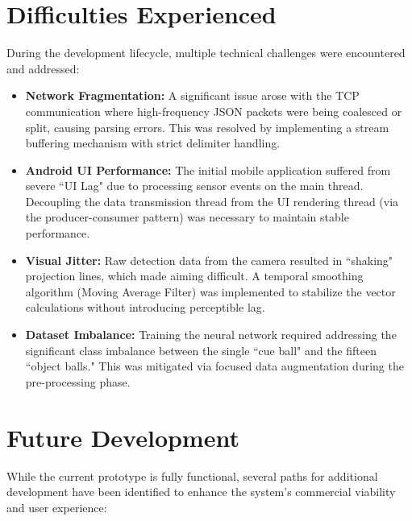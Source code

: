 \section{Difficulties Experienced}
During the development lifecycle, multiple technical challenges were encountered and addressed:

\begin{itemize}
    \item \textbf{Network Fragmentation:} A significant issue arose with the TCP communication where high-frequency JSON packets were being coalesced or split, causing parsing errors. This was resolved by implementing a stream buffering mechanism with strict delimiter handling.
    \item \textbf{Android UI Performance:} The initial mobile application suffered from severe ``UI Lag" due to processing sensor events on the main thread. Decoupling the data transmission thread from the UI rendering thread (via the producer-consumer pattern) was necessary to maintain stable performance.
    \item \textbf{Visual Jitter:} Raw detection data from the camera resulted in ``shaking" projection lines, which made aiming difficult. A temporal smoothing algorithm (Moving Average Filter) was implemented to stabilize the vector calculations without introducing perceptible lag.
    \item \textbf{Dataset Imbalance:} Training the neural network required addressing the significant class imbalance between the single ``cue ball" and the fifteen ``object balls." This was mitigated via focused data augmentation during the pre-processing phase.

\end{itemize}

\section{Future Development}
While the current prototype is fully functional, several paths for additional development have been identified to enhance the system's commercial viability and user experience:

